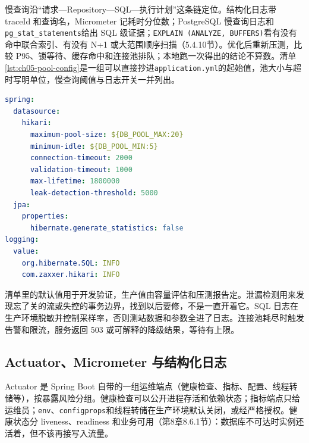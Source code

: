 慢查询沿“请求—Repository—SQL—执行计划”这条链定位。结构化日志带 traceId 和查询名，Micrometer 记耗时分位数；PostgreSQL 慢查询日志和\texttt{pg\_stat\_statements}给出 SQL 级证据；\texttt{EXPLAIN (ANALYZE, BUFFERS)}看有没有命中联合索引、有没有 N+1 或大范围顺序扫描（5.4.10节）。优化后重新压测，比较 P95、锁等待、缓存命中和连接池排队；本地跑一次得出的结论不算数。清单\ref{lst:ch05-pool-config}是一组可以直接抄进\texttt{application.yml}的起始值，池大小与超时写明单位，慢查询阈值与日志开关一并列出。

\begin{lstlisting}[label={lst:ch05-pool-config},language=YAML,caption={连接池、超时与慢查询日志配置}]
spring:
  datasource:
    hikari:
      maximum-pool-size: ${DB_POOL_MAX:20}
      minimum-idle: ${DB_POOL_MIN:5}
      connection-timeout: 2000
      validation-timeout: 1000
      max-lifetime: 1800000
      leak-detection-threshold: 5000
  jpa:
    properties:
      hibernate.generate_statistics: false
logging:
  value:
    org.hibernate.SQL: INFO
    com.zaxxer.hikari: INFO
\end{lstlisting}

清单里的默认值用于开发验证，生产值由容量评估和压测报告定。泄漏检测用来发现忘了关的流或失控的事务边界，找到以后要修，不是一直开着它。SQL 日志在生产环境脱敏并控制采样率，否则测站数据和参数全进了日志。连接池耗尽时触发告警和限流，服务返回 503 或可解释的降级结果，等待有上限。

\subsection{Actuator、Micrometer 与结构化日志}

Actuator 是 Spring Boot 自带的一组运维端点（健康检查、指标、配置、线程转储等），按暴露风险分组。健康检查可以公开进程存活和依赖状态；指标端点只给运维员；\texttt{env}、\texttt{configprops}和线程转储在生产环境默认关闭，或经严格授权。健康状态分 liveness、readiness 和业务可用（第8章8.6.1节）：数据库不可达时实例还活着，但不该再接写入流量。

